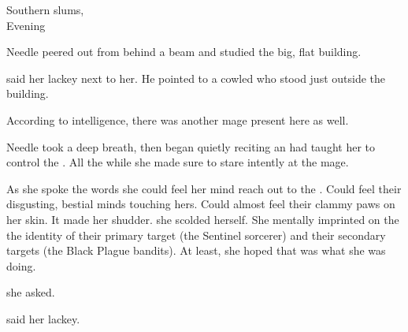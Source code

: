 \begin{comment}
\section{Needle and Rian}
\end{comment}

\stamp
  {\dateRianSeesRaid}
  {Southern slums, \\
   Evening}

\begin{comment}
\subsection{Needle}
\end{comment}
\new
Needle peered out from behind a beam and studied the big, flat building. 

 said her lackey next to her. 
He pointed to a cowled \dax{} who stood just outside the building. 

According to intelligence, there was another mage present here as well. 

Needle took a deep breath, then began quietly reciting an  \Achsah{} had taught her to control the \grimrats.
All the while she made sure to stare intently at the mage. 

As she spoke the words she could feel her mind reach out to the \banerats. 
Could feel their disgusting, bestial minds touching hers. 
Could almost feel their clammy paws on her skin. 
It made her shudder. 
 she scolded herself. 
She mentally imprinted on the \banerats{} the identity of their primary target (the Sentinel sorcerer) and their secondary targets (the Black Plague bandits). 
At least, she hoped that was what she was doing. 

 she asked. 

 said her lackey.

